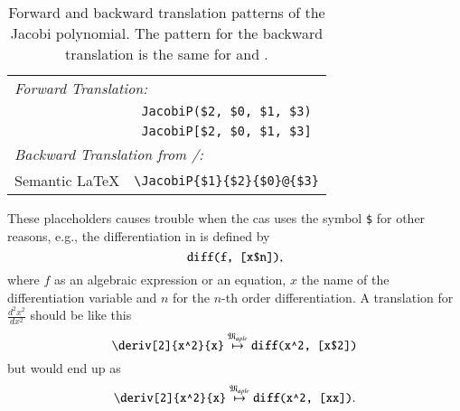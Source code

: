 \begin{table}[ht]
	\centering
	\begin{tabular}{lc}
		\hline
		\multicolumn{2}{l}{\textit{Forward Translation:}} \\
		\Maple & \verb|JacobiP($2, $0, $1, $3)| \\
		\Mathematica & \verb|JacobiP[$2, $0, $1, $3]|\\
		\hline
		\multicolumn{2}{l}{\textit{Backward Translation from \Maple/\Mathematica:}} \\
		Semantic \LaTeX & \verb|\JacobiP{$1}{$2}{$0}@{$3}|\\
		\hline
	\end{tabular}
	\caption{Forward and backward translation patterns of the Jacobi polynomial. The pattern for the backward translation is the same for \Maple{} and \Mathematica.}
	\label{tab:placeholder_ex2}
\end{table}

These placeholders causes trouble when the \gls*{cas} uses the symbol \verb|$| for other reasons, e.g., the differentiation in \Maple{} is defined by
\begin{equation*}
\verb|diff(f, [x$n])|,
\end{equation*}
where $f$ as an algebraic expression or an equation, $x$ the name of the differentiation variable and $n$ for the $n$-th order differentiation. A translation for $\frac{d^2x^2}{dx^2}$ should be like this
\begin{equation*}
\verb|\deriv[2]{x^2}{x}| \overset{\langMaple}{\mapsto} \verb|diff(x^2, [x$2])|
\end{equation*}
but would end up as
\begin{equation*}
\verb|\deriv[2]{x^2}{x}| \overset{\langMaple}{\mapsto} \verb|diff(x^2, [xx])|.
\end{equation*}


